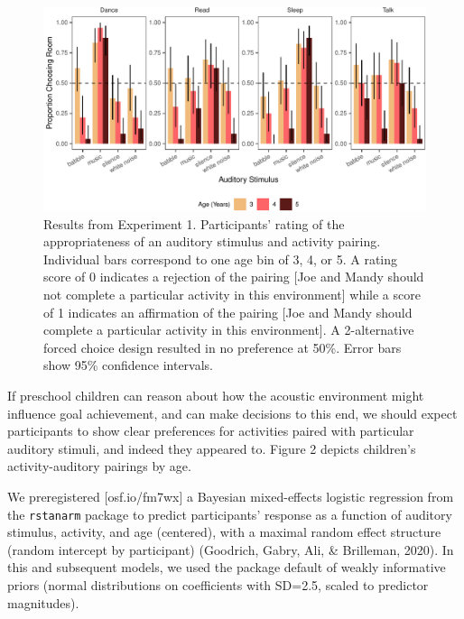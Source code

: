 \documentclass[10pt, letterpaper]{article}
\newenvironment{CodeChunk}{}{}
\begin{document}
\begin{CodeChunk}
\begin{figure}[t]

{\centering \includegraphics{figs/e3b-bar-1} 

}

\caption[Results from Experiment 1]{Results from Experiment 1. Participants' rating of the appropriateness of an auditory stimulus and activity pairing. Individual bars correspond to one age bin of 3, 4, or 5. A rating score of 0 indicates a rejection of the pairing [Joe and Mandy should not complete a particular activity in this environment] while a score of 1 indicates an affirmation of the pairing [Joe and Mandy should complete a particular activity in this environment]. A 2-alternative forced choice design resulted in no preference at 50\%.  Error bars show 95\% confidence intervals.}\label{fig:e3b-bar}
\end{figure}
\end{CodeChunk}

If preschool children can reason about how the acoustic environment
might influence goal achievement, and can make decisions to this end, we
should expect participants to show clear preferences for activities
paired with particular auditory stimuli, and indeed they appeared to.
Figure 2 depicts children's activity-auditory pairings by age.

We preregistered {[}osf.io/fm7wx{]} a Bayesian mixed-effects logistic
regression from the \texttt{rstanarm} package to predict participants'
response as a function of auditory stimulus, activity, and age
(centered), with a maximal random effect structure (random intercept by
participant) (Goodrich, Gabry, Ali, \& Brilleman, 2020). In this and
subsequent models, we used the package default of weakly informative
priors (normal distributions on coefficients with SD=2.5, scaled to
predictor magnitudes).
\end{document}
